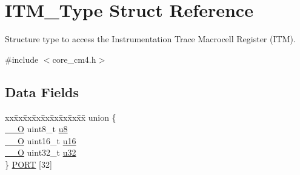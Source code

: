 \hypertarget{struct_i_t_m___type}{}\section{I\+T\+M\+\_\+\+Type Struct Reference}
\label{struct_i_t_m___type}


Structure type to access the Instrumentation Trace Macrocell Register (I\+TM).  




{\ttfamily \#include $<$core\+\_\+cm4.\+h$>$}

\subsection*{Data Fields}
\begin{DoxyCompactItemize}
\item 
\begin{tabbing}
xx\=xx\=xx\=xx\=xx\=xx\=xx\=xx\=xx\=\kill
union \{\\
\>\hyperlink{group___c_m_s_i_s__core__definitions_ga7e25d9380f9ef903923964322e71f2f6}{\_\_O} uint8\_t \hyperlink{struct_i_t_m___type_a0374c0b98ab9de6f71fabff7412df832}{u8}\\
\>\hyperlink{group___c_m_s_i_s__core__definitions_ga7e25d9380f9ef903923964322e71f2f6}{\_\_O} uint16\_t \hyperlink{struct_i_t_m___type_ae8d499140220fa6d4eab1da7262bf08e}{u16}\\
\>\hyperlink{group___c_m_s_i_s__core__definitions_ga7e25d9380f9ef903923964322e71f2f6}{\_\_O} uint32\_t \hyperlink{struct_i_t_m___type_acaf6d0e14a3d4b541c624913b4a1931e}{u32}\\
\} \hyperlink{struct_i_t_m___type_aca2b00738a4a346efcd8325e18fcfa8a}{PORT} \mbox{[}32\mbox{]}\\


\end{tabbing}
\end{DoxyCompactItemize}
